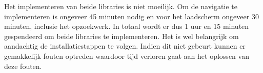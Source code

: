 Het implementeren van beide libraries is niet moeilijk. Om de navigatie te implementeren 
is ongeveer 45 minuten nodig en voor het laadscherm ongeveer 30 minuten, inclusie het opzoekwerk. In totaal wordt er dus
1 uur en 15 minuten gespendeerd om beide libraries te implementeren. Het is wel belangrijk 
om aandachtig de installatiestappen te volgen. Indien dit niet gebeurt kunnen er gemakkelijk fouten optreden 
waardoor tijd verloren gaat aan het oplossen van deze fouten.


